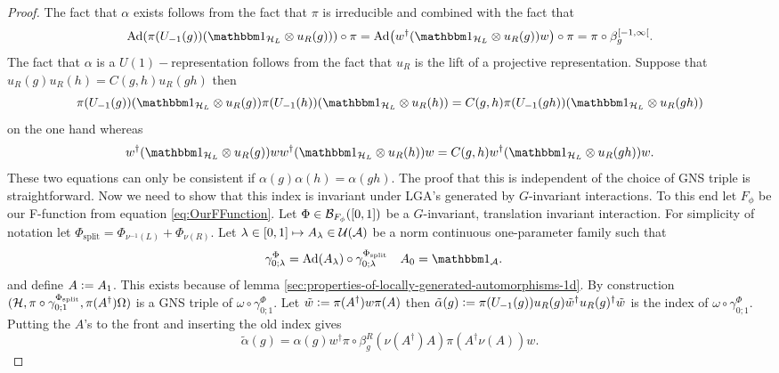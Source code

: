 \documentclass[11pt,a4paper,twoside]{article}
\numberwithin{equation}{section}
\begin{document}
	\begin{proof}
		The fact that $\alpha$ exists follows from the fact that $\pi$ is irreducible and combined with the fact that
		\begin{equation}
			\Ad{\pi(U_{-1}(g)) (\id_{\HH_L}\otimes u_R(g))}\circ\pi=\Ad{w^\dagger(\id_{\HH_L}\otimes u_R(g)) w}\circ\pi=\pi\circ\beta_g^{[-1,\infty[}.
		\end{equation}
		The fact that $\alpha$ is a $U(1)-$representation follows from the fact that $u_R$ is the lift of a projective representation. Suppose that $u_R(g)u_R(h)=C(g,h)u_R(gh)$ then
		\begin{equation}
			\pi(U_{-1}(g)) (\id_{\HH_L}\otimes u_R(g))\pi(U_{-1}(h)) (\id_{\HH_L}\otimes u_R(h))=C(g,h)\pi(U_{-1}(gh)) (\id_{\HH_L}\otimes u_R(gh))
		\end{equation}
		on the one hand whereas
		\begin{equation}
			w^\dagger(\id_{\HH_L}\otimes u_R(g)) ww^\dagger(\id_{\HH_L}\otimes u_R(h)) w=C(g,h)w^\dagger(\id_{\HH_L}\otimes u_R(gh)) w.
		\end{equation}
		These two equations can only be consistent if $\alpha(g)\alpha(h)=\alpha(gh)$. The proof that this is independent of the choice of GNS triple is straightforward. Now we need to show that this index is invariant under LGA's generated by $G$-invariant interactions. To this end let $F_\phi$ be our F-function from equation \eqref{eq:OurFFunction}. Let $\Phi\in\mathcal B_{F_\phi}([0,1])$ be a $G$-invariant, translation invariant interaction. For simplicity of notation let $\Phi_{\text{split}}=\Phi_{\nu^{-1}(L)}+\Phi_{\nu(R)}$. Let $\lambda\in[0,1]\mapsto A_\lambda\in\mathcal U(\mathcal A)$ be a norm continuous one-parameter family such that
		\begin{align}\label{eq:DefinitionSplitting1DAppendix}
			\gamma^\Phi_{0;\lambda}&=\Ad{A_\lambda}\circ\gamma^{\Phi_{\text{split}}}_{0;\lambda}&A_0&=\id_\AA.
		\end{align}
		and define $A\vcentcolon= A_1$. This exists because of lemma \ref{sec:properties-of-locally-generated-automorphisms-1d}. By construction $(\mathcal H,\pi\circ\gamma^{\Phi_{\text{split}}}_{0;1},\pi(A^\dagger)\Omega)$ is a GNS triple of $\omega\circ\gamma^\Phi_{0;1}$. Let $\tilde{w}\vcentcolon= \pi(A^\dagger)w\pi(A)$ then $\tilde{\alpha}(g)\vcentcolon= \pi(U_{-1}(g))u_R(g)\tilde{w}^\dagger u_R(g)^\dagger \tilde{w}$ is the index of $\omega\circ\gamma^\Phi_{0;1}$. Putting the $A$'s to the front and inserting the old index gives
		\begin{equation}
			\tilde{\alpha}(g)=\alpha(g)w^\dagger \pi\circ\beta_g^R(\nu(A^\dagger)A)\pi(A^\dagger\nu(A))w.

\end{equation}
\end{proof}
\end{document}
